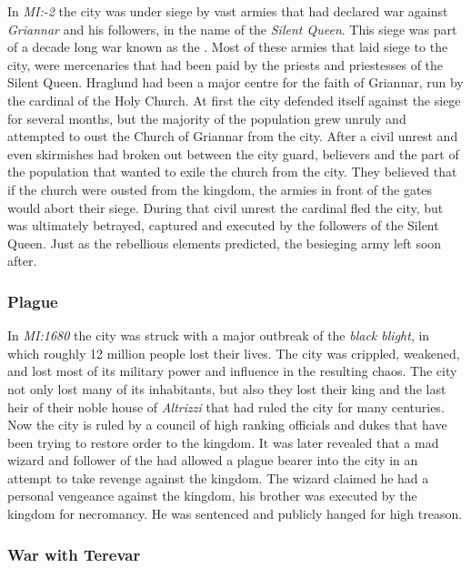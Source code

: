 In \emph{MI:-2} the city was under siege by vast armies that had declared war
against \emph{Griannar} and his followers, in the name of the
\emph{Silent Queen}. This siege was part of a decade long war known as the
. Most of these armies that laid siege to the city,
were mercenaries that had been paid by the priests and priestesses of the
Silent Queen. Hraglund had been a major centre for the faith of Griannar, run
by the cardinal of the Holy Church. At first the city defended itself against
the siege for several months, but the majority of the population grew unruly
and attempted to oust the Church of Griannar from the city. After a civil
unrest and even skirmishes had broken out between the city guard, believers
and the part of the population that wanted to exile the church from the
city. They believed that if the church were ousted from the kingdom, the
armies in front of the gates would abort their siege. During that civil unrest
the cardinal fled the city, but was ultimately betrayed, captured and executed
by the followers of the Silent Queen. Just as the rebellious elements
predicted, the besieging army left soon after.

\subsubsection{Plague}
\label{sec:Plague of Hraglund}

In \emph{MI:1680} the city was struck with a major outbreak of the
\emph{black blight}, in which roughly 12 million people lost their lives. The
city was crippled, weakened, and lost most of its military power and influence
in the resulting chaos. The city not only lost many of its inhabitants, but
also they lost their king and the last heir of their noble house of
\emph{Altrizzi} that had ruled the city for many centuries. Now the city is
ruled by a council of high ranking officials and dukes that have been trying
to restore order to the kingdom. It was later revealed that a mad wizard and
follower of the  had allowed a plague bearer into the city
in an attempt to take revenge against the kingdom. The wizard claimed he had a
personal vengeance against the kingdom, his brother was executed by the
kingdom for necromancy. He was sentenced and publicly hanged for high treason.

\subsubsection{War with Terevar}
\label{sec:Terevar}

